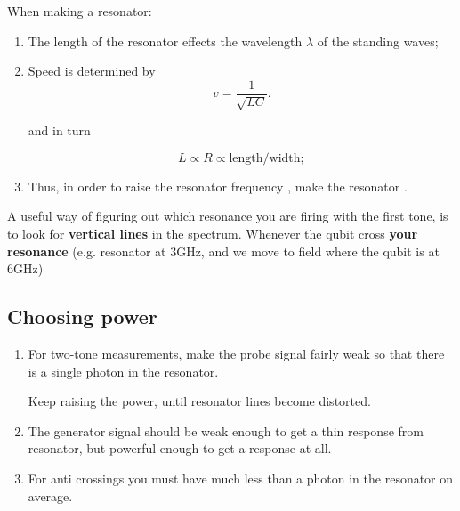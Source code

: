 \begin{framed}\noindent
  When making a resonator:
  \begin{enumerate}
  \item  The length  of the  resonator effects  the wavelength  $\lambda$ of  the
    standing waves;

  \item Speed is determined by
    \begin{equation}
      \label{eq:resonator2}
      v = \frac{1}{\sqrt{LC}}.
    \end{equation}

    \noindent and in turn

    \begin{equation}
      \label{eq:resonator3}
      L      \propto  R \propto  \text{length}/\text{width};
    \end{equation}

  \item  Thus,  in order  to  raise  the resonator  frequency  , make the
    resonator .
  \end{enumerate}
\end{framed}

\noindent A useful  way of figuring out  which resonance you are  firing with the
first tone, is to look for \textbf{vertical lines} in the spectrum.  Whenever the
qubit cross  \textbf{your resonance}  (e.g.  resonator  at 3GHz,  and we  move to
field  where the  qubit  is at  6GHz) 

\subsection{Choosing power}
\label{sec:choosing-power}

\begin{enumerate}
\item For two-tone measurements, make the probe signal  fairly weak
  so that there is a single photon in the resonator.

  Keep raising the power, until resonator lines become distorted.

\item The  generator signal  should be weak  enough to get  a thin
  response from resonator, but powerful enough to get a response at all.
\item For anti crossings  you must have much less than a  photon in the resonator
  on average.
\end{enumerate}

\newpage

